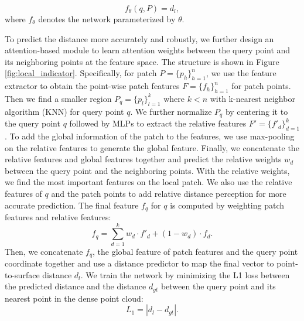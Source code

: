 \documentclass[letterpaper]{article} %
\begin{document}
\begin{equation}
\label{eq:definition of distance indicator}
f_{\theta}(q,P)=d_l,
\end{equation}
where $f_{\theta}$ denotes the network parameterized by $\theta$.

To predict the distance more accurately and robustly, we further design an attention-based module to learn attention weights between the query point and its neighboring points at the feature space. The structure is shown in Figure \ref{fig:local_indicator}. Specifically, for patch $P=\{p_h\}_{h=1}^n$, we use the feature extractor to obtain the point-wise patch features $F=\{f_h\}_{h=1}^n$ for patch points. Then we find a smaller region $P_q = \{p_l\}_{l=1}^k$ where $k < n$ with k-nearest neighbor algorithm (KNN) for query point $q$. We further normalize $P_q$ by centering it to the query point $q$ followed by MLPs to extract the relative features $F'=\{f'_d\}_{d=1}^k$. To add the global information of the patch to the features, we use max-pooling on the relative features to generate the global feature. Finally, we concatenate the relative features and global features together and predict the relative weights $w_d$ between the query point and the neighboring points. With the relative weights, we find the most important features on the local patch. We also use the relative features of $q$ and the patch points to add relative distance perception for more accurate prediction. The final feature $f_q$ for $q$ is computed by weighting patch features and relative features:
\begin{equation}
\label{eq:final feature for query point}
f_q = \sum_{d=1}^k{w_d\cdot f'_d+(1-w_d) \cdot f_d}.
\end{equation}
Then, we concatenate $f_q$, the global feature of patch features and the query point coordinate together and use a distance predictor to map the final vector to point-to-surface distance $d_l$. We train the network by minimizing the L1 loss between the predicted distance and the distance $d_{gt}$ between the query point and its nearest point in the dense point cloud:
\begin{equation}
\label{eq:local_distance_indicator}
L_1 = |d_l-d_{gt}|.
\end{equation}
\end{document}
